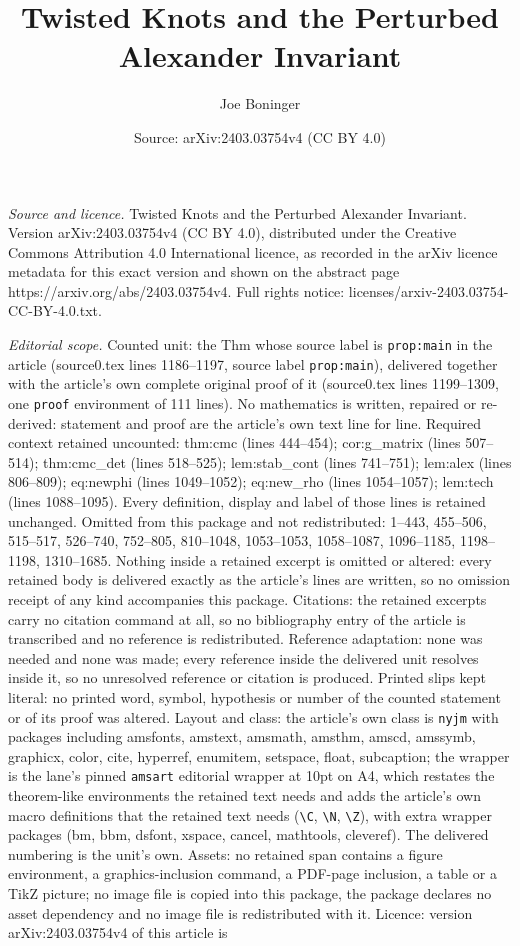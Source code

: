 \documentclass[10pt,a4paper]{amsart}
\title[Twisted Knots and the Perturbed Alexander Invariant]{Twisted Knots and the Perturbed Alexander Invariant}
\author{Joe Boninger}
\date{Source: arXiv:2403.03754v4 (CC BY 4.0)}
\begin{document}
\maketitle

\noindent\emph{Source and licence.} Twisted Knots and the Perturbed Alexander Invariant. Version arXiv:2403.03754v4 (CC BY 4.0), distributed under the Creative Commons Attribution 4.0 International licence, as recorded in the arXiv licence metadata for this exact version and shown on the abstract page https://arxiv.org/abs/2403.03754v4. Full rights notice: licenses/arxiv-2403.03754-CC-BY-4.0.txt.\par\smallskip

\noindent\textit{Editorial scope.} Counted unit: the Thm whose source label is \texttt{prop:main} in the article (source0.tex lines 1186--1197, source label \texttt{prop:main}), delivered together with the article's own complete original proof of it (source0.tex lines 1199--1309, one \texttt{proof} environment of 111 lines). No mathematics is written, repaired or re-derived: statement and proof are the article's own text line for line. Required context retained uncounted: thm:cmc (lines 444--454); cor:g\_matrix (lines 507--514); thm:cmc\_det (lines 518--525); lem:stab\_cont (lines 741--751); lem:alex (lines 806--809); eq:newphi (lines 1049--1052); eq:new\_rho (lines 1054--1057); lem:tech (lines 1088--1095). Every definition, display and label of those lines is retained unchanged. Omitted from this package and not redistributed: 1--443, 455--506, 515--517, 526--740, 752--805, 810--1048, 1053--1053, 1058--1087, 1096--1185, 1198--1198, 1310--1685. Nothing inside a retained excerpt is omitted or altered: every retained body is delivered exactly as the article's lines are written, so no omission receipt of any kind accompanies this package. Citations: the retained excerpts carry no citation command at all, so no bibliography entry of the article is transcribed and no reference is redistributed. Reference adaptation: none was needed and none was made; every reference inside the delivered unit resolves inside it, so no unresolved reference or citation is produced. Printed slips kept literal: no printed word, symbol, hypothesis or number of the counted statement or of its proof was altered. Layout and class: the article's own class is \texttt{nyjm} with packages including amsfonts, amstext, amsmath, amsthm, amscd, amssymb, graphicx, color, cite, hyperref, enumitem, setspace, float, subcaption; the wrapper is the lane's pinned \texttt{amsart} editorial wrapper at 10pt on A4, which restates the theorem-like environments the retained text needs and adds the article's own macro definitions that the retained text needs (\texttt{\textbackslash C}, \texttt{\textbackslash N}, \texttt{\textbackslash Z}), with extra wrapper packages (bm, bbm, dsfont, xspace, cancel, mathtools, cleveref). The delivered numbering is the unit's own. Assets: no retained span contains a figure environment, a graphics-inclusion command, a PDF-page inclusion, a table or a TikZ picture; no image file is copied into this package, the package declares no asset dependency and no image file is redistributed with it. Licence: version arXiv:2403.03754v4 of this article is 
\end{document}
